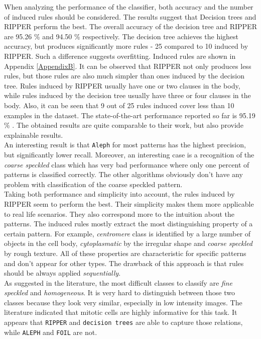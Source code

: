 When analyzing the performance of the classifier, both accuracy and the number of induced rules should be considered. The results suggest that Decision trees and RIPPER perform the best. The overall accuracy of the decision tree and RIPPER are 95.26 \% and 94.50 \% respectively. The decision tree achieves the highest accuracy, but produces significantly  more rules - 25 compared to 10 induced by RIPPER. Such a difference suggests  overfitting. Induced rules are shown in Appendix \ref{AppendixB}. It can be observed that RIPPER not only produces less rules, but those rules are also much simpler than ones induced by the decision tree. Rules induced by RIPPER usually have one or two clauses in the body, while rules induced by the decision tree usually have three or four clauses in the body. Also, it can be seen that 9 out of 25 rules induced cover less than 10 examples in the dataset. The state-of-the-art performance reported so far is 95.19 \% \cite{Wiliem}. The obtained results are quite comparable to their work, but also provide explainable results.\\

An interesting result is that \texttt{Aleph} for most patterns has the highest precision, but significantly lower recall. Moreover, an interesting case is a recognition of the \textit{coarse speckled} class which has very bad performance where only one percent of patterns is classified correctly. The other algorithms obviously don't have any problem with classification of the coarse speckled pattern. \\

Taking both performance and simplicity into account, the rules induced by RIPPER seem to perform the best. Their simplicity makes them more applicable to real life scenarios. They also correspond more to the intuition about the patterns. The induced rules mostly extract the most distinguishing property of a certain pattern. For example, \textit{centromere} class is identified by a large number of objects in the cell body, \textit{cytoplasmatic} by the irregular shape and \textit{coarse speckled} by rough texture. All of these properties are characteristic for specific patterns and don't appear for other types. The drawback of this approach is that rules should be always applied \textit{sequentially}. \\

As suggested in the literature, the most difficult classes to classify are \textit{fine speckled} and \textit{homogeneous}. It is very hard to distinguish between those two classes because they look very similar, especially in low intensity images. The literature indicated that mitotic cells are highly informative for this task. It appears that  \texttt{RIPPER} and \texttt{decision trees} are able to capture those relations, while \texttt{ALEPH} and \texttt{FOIL} are not.

